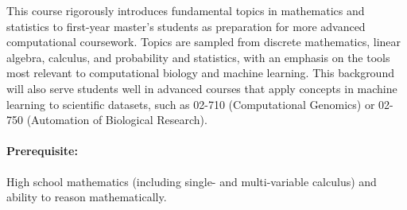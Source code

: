\documentclass[12pt]{scrartcl}
\begin{document}
This course rigorously introduces fundamental topics in mathematics and statistics 
to first-year master's students as preparation for more advanced computational coursework. 
Topics are sampled from discrete mathematics, linear algebra, calculus, and probability and statistics, with an emphasis on the tools most relevant to computational biology and machine learning.
This background will also serve students well in advanced courses that apply concepts in 
machine learning to scientific datasets, such as 
02-710 (Computational Genomics) or 02-750 (Automation of Biological Research). 

\paragraph{Prerequisite:} 
High school mathematics (including single- and multi-variable calculus) and ability to reason mathematically.

\end{document}

